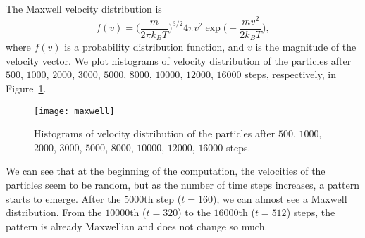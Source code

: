 The Maxwell velocity distribution is
%
\begin{equation}
    f(v) = \biggl( \frac{m}{2\pi k_B T} \biggr)^{3/2}
    4\pi v^2 \exp{\biggl( -\frac{m v^2}{2 k_B T} \biggr)},
\end{equation}
%
where $f(v)$ is a probability distribution function, and $v$ is the magnitude of the
velocity vector.
We plot histograms of velocity distribution of the particles after
$500$, $1000$, $2000$, $3000$, $5000$, $8000$, $10000$, $12000$, $16000$ steps,
respectively, in Figure~\ref{fig:maxwell}.
%
\begin{figure}
    \centering
    \texttt{[image: maxwell]}
    \caption{Histograms of velocity distribution of the particles after
        $500$, $1000$, $2000$, $3000$, $5000$, $8000$, $10000$, $12000$, $16000$ steps.}
    \label{fig:maxwell}
\end{figure}
%
We can see that at the beginning of the computation, the velocities of the particles
seem to be random, but as the number of time steps increases, a pattern starts to
emerge. After the $5000$th step ($t = 160$), we can almost see a Maxwell distribution.
From the $10000$th ($t = 320$) to the $16000$th ($t = 512$) steps, the pattern is
already Maxwellian and does not change so much.
